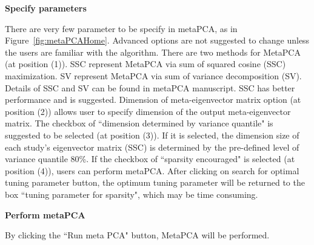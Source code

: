 \begin{steps}

\item \textbf{Specify parameters} 

There are very few parameter to be specify in metaPCA, as in Figure~\ref{fig:metaPCAHome}.
Advanced options are not suggested to change unless the users are familiar with the algorithm.
There are two methods for MetaPCA (at position {\color{red} (1)}). 
SSC represent MetaPCA via sum of squared cosine (SSC) maximization.
SV represent MetaPCA via sum of variance decomposition (SV).
Details of SSC and SV can be found in metaPCA manuscript.
SSC has better performance and is suggested.
Dimension of meta-eigenvector matrix option (at position {\color{red} (2)}) allows user to specify dimension of the output meta-eigenvector matrix.
The checkbox of ``dimension determined by variance quantile" is suggested to be selected (at position {\color{red} (3)}).
If it is selected, the dimension size of each study's eigenvector matrix (SSC) is determined  by the pre-defined level of variance quantile 80\%.
If the checkbox of ``sparsity encouraged" is selected (at position {\color{red} (4)}), users can perform metaPCA.
After clicking on search for optimal tuning parameter button, the optimum tuning parameter will be returned to the box ``tuning parameter for sparsity", 
which may be time consuming.

\item \textbf{Perform metaPCA} 

By clicking the ``Run meta PCA" button, MetaPCA will be performed.


\end{steps}

